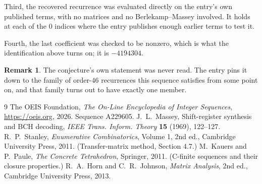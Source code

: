 \documentclass[11pt,a4paper]{article}
\theoremstyle{plain}
\theoremstyle{definition}
\newtheorem{remark}[theorem]{Remark}
\begin{document}
Third, the recovered recurrence was evaluated directly on the entry's own published terms, with
no matrices and no Berlekamp--Massey involved. It holds at each of the $0$ indices where
the entry publishes enough earlier terms to test it.

Fourth, the last coefficient was checked to be nonzero, which is what the identification above
turns on; it is $-4194304$.

\begin{remark}
The conjecture's own statement was never read. The entry pins it down to the family of
order-$46$ recurrences this sequence satisfies from some point on, and that family turns
out to have exactly one member.
\end{remark}

\begin{thebibliography}{9}
 The OEIS Foundation, \emph{The On-Line Encyclopedia of Integer
Sequences}, \url{https://oeis.org}, 2026. Sequence A229605.
 J.~L.~Massey, Shift-register synthesis and BCH decoding, \emph{IEEE
Trans. Inform. Theory} \textbf{15} (1969), 122--127.
 R.~P.~Stanley, \emph{Enumerative Combinatorics}, Volume 1, 2nd ed.,
Cambridge University Press, 2011. (Transfer-matrix method, Section 4.7.)
 M.~Kauers and P.~Paule, \emph{The Concrete Tetrahedron}, Springer, 2011.
(C-finite sequences and their closure properties.)
 R.~A.~Horn and C.~R.~Johnson, \emph{Matrix Analysis}, 2nd ed., Cambridge
University Press, 2013.
\end{thebibliography}
\end{document}
